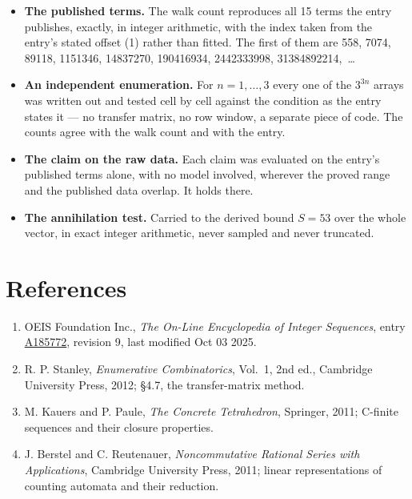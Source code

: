 \documentclass[11pt]{article}
\theoremstyle{definition}
\begin{document}
\begin{itemize}

\item {\bfseries The published terms.} The walk count reproduces all 15 terms the entry publishes, exactly, in integer arithmetic, with the index taken from the entry's stated offset (1) rather than fitted. The first of them are 558, 7074, 89118, 1151346, 14837270, 190416934, 2442333998, 31384892214,~\dots

\item {\bfseries An independent enumeration.} For $n = 1,\dots,3$ every one of the $3^{3n}$ arrays was written out and tested cell by cell against the condition as the entry states it --- no transfer matrix, no row window, a separate piece of code. The counts agree with the walk count and with the entry.

\item {\bfseries The claim on the raw data.} Each claim was evaluated on the entry's published terms alone, with no model involved, wherever the proved range and the published data overlap. It holds there.

\item {\bfseries The annihilation test.} Carried to the derived bound $S = 53$ over the whole vector, in exact integer arithmetic, never sampled and never truncated.

\end{itemize}

\section{References}

\begin{enumerate}

\item OEIS Foundation Inc., \emph{The On-Line Encyclopedia of Integer Sequences}, entry \href{https://oeis.org/A185772}{A185772}, revision 9, last modified Oct 03 2025.

\item R. P. Stanley, \emph{Enumerative Combinatorics}, Vol.~1, 2nd ed., Cambridge University Press, 2012; \S4.7, the transfer-matrix method.

\item M. Kauers and P. Paule, \emph{The Concrete Tetrahedron}, Springer, 2011; C-finite sequences and their closure properties.

\item J. Berstel and C. Reutenauer, \emph{Noncommutative Rational Series with Applications}, Cambridge University Press, 2011; linear representations of counting automata and their reduction.

\end{enumerate}
\end{document}
